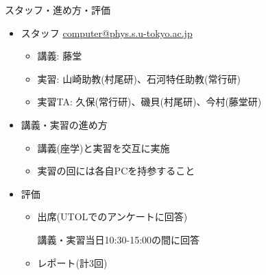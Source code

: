 \begin{frame}[t,fragile]{スタッフ・進め方・評価}
  \begin{itemize}
  \item スタッフ \href{mailto:computer@.phys.s.u-tokyo.ac.jp}{computer@phys.s.u-tokyo.ac.jp}
    \begin{itemize}
    \item 講義: 藤堂
    \item 実習: 山崎助教(村尾研)、石河特任助教(常行研)
    \item 実習TA: 久保(常行研)、磯貝(村尾研)、今村(藤堂研)
    \end{itemize}
  \item 講義・実習の進め方
    \begin{itemize}
    \item 講義(座学)と実習を交互に実施
    \item 実習の回には各自PCを持参すること
    \end{itemize}
  \item 評価
    \begin{itemize}
    \item 出席(UTOLでのアンケートに回答)

      講義・実習当日10:30-15:00の間に回答
      
    \item レポート(計3回)
    \end{itemize}    
  \end{itemize}    
\end{frame}

